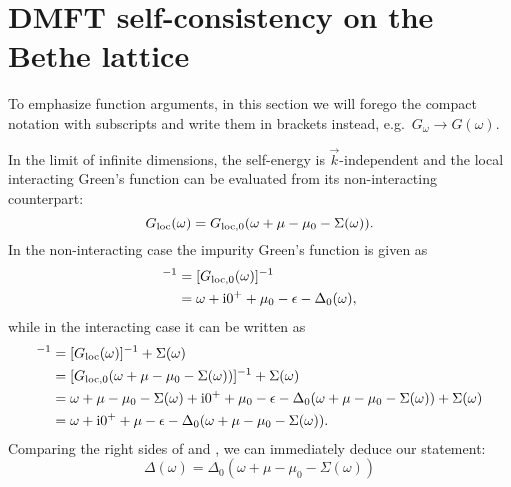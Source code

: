 \section{DMFT self-consistency on the Bethe lattice}
\label{app:dmft-bethe}

To emphasize function arguments,
in this section
we will forego the compact notation with subscripts and write them in brackets instead,
e.g.\ $G_\omega \to G(\omega)$.

In the limit of infinite dimensions, the self-energy is $\vec{k}$-independent
and the local interacting Green's function can be evaluated from
its non-interacting counterpart:
\begin{equation}
    G_{\mathrm{loc}}(\omega)
    =
    G_{\mathrm{loc},0}(\omega + \mu - \mu_0 - \Sigma(\omega)).
\end{equation}
In the non-interacting case the impurity Green's function is given as
\begin{align}
    [G_0(\omega)]^{-1}
     & =
    [G_{\mloc,0}(\omega)]^{-1} \\
     & =
    \omega + \mi0^+ + \mu_0 - \epsilon - \Delta_0(\omega),
    \label{eq:impurity-gf-non-interacting}
\end{align}
while in the interacting case it can be written as
\begin{align}
    [G_0(\omega)]^{-1}
     & =
    [G_{\mloc}(\omega)]^{-1} + \Sigma(\omega)                                                                                             \\
     & =
    [G_{\mloc,0}(\omega + \mu - \mu_0 - \Sigma(\omega))]^{-1} + \Sigma(\omega)                                                            \\
     & =
    \omega + \mu - \mu_0  - \Sigma(\omega) + \mi0^+ + \mu_0 - \epsilon - \Delta_0(\omega + \mu - \mu_0 - \Sigma(\omega)) + \Sigma(\omega) \\
     & =
    \omega + \mi0^+ + \mu - \epsilon - \Delta_0(\omega + \mu - \mu_0 - \Sigma(\omega)).
    \label{eq:impurity-gf-interacting}
\end{align}
Comparing the right sides of  and ,
we can immediately deduce our statement:
\begin{equation}
    \Delta(\omega) = \Delta_0(\omega + \mu - \mu_0 - \Sigma(\omega))
\end{equation}
